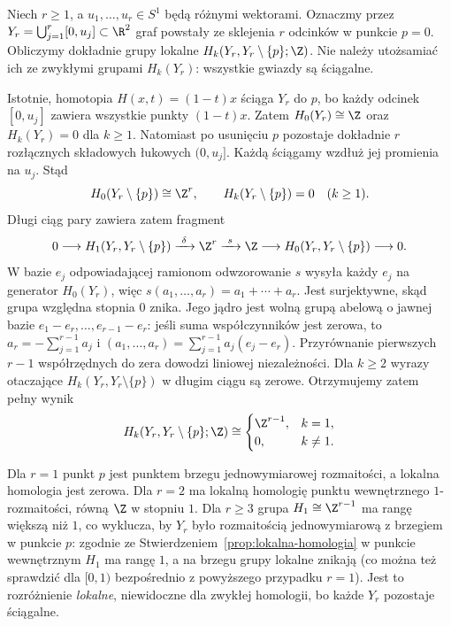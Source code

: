 \begin{przyklad}
\label{prz:homologia-lokalna-r-ramion-at05}
Niech $r\geq1$, a $u_1,\ldots,u_r\in S^1$
będą różnymi wektorami. Oznaczmy przez
$Y_r=\bigcup_{j=1}^r[0,u_j]\subset\R^2$
graf powstały ze sklejenia $r$ odcinków w punkcie
$p=0$. Obliczymy dokładnie grupy lokalne
$H_k(Y_r,Y_r\setminus\{p\};\Z)$.
Nie należy utożsamiać ich ze zwykłymi
grupami $H_k(Y_r)$: wszystkie gwiazdy są ściągalne.

Istotnie, homotopia $H(x,t)=(1-t)x$
ściąga $Y_r$ do $p$, bo każdy odcinek
$[0,u_j]$ zawiera wszystkie punkty $(1-t)x$.
Zatem $H_0(Y_r)\cong\Z$ oraz $H_k(Y_r)=0$
dla $k\geq1$. Natomiast po usunięciu $p$
pozostaje dokładnie $r$ rozłącznych
składowych łukowych $(0,u_j]$.
Każdą ściągamy wzdłuż jej promienia na $u_j$.
Stąd
\[
 H_0(Y_r\setminus\{p\})\cong\Z^r,\qquad
 H_k(Y_r\setminus\{p\})=0\quad(k\geq1).
\]
Długi ciąg pary zawiera zatem fragment
\[
 0\longrightarrow H_1(Y_r,Y_r\setminus\{p\})
 \xrightarrow{\ \delta\ }\Z^r
 \xrightarrow{\ s\ }\Z
 \longrightarrow H_0(Y_r,Y_r\setminus\{p\})
 \longrightarrow0.
\]
W bazie $e_j$ odpowiadającej ramionom
odwzorowanie $s$ wysyła każdy $e_j$ na
generator $H_0(Y_r)$, więc
$s(a_1,\ldots,a_r)=a_1+\cdots+a_r$.
Jest surjektywne, skąd grupa względna stopnia
$0$ znika. Jego jądro jest wolną grupą abelową
o jawnej bazie $e_1-e_r,\ldots,e_{r-1}-e_r$:
jeśli suma współczynników jest zerowa,
to $a_r=-\sum_{j=1}^{r-1}a_j$ i
$(a_1,\ldots,a_r)=\sum_{j=1}^{r-1}a_j(e_j-e_r)$.
Przyrównanie pierwszych $r-1$ współrzędnych do
zera dowodzi liniowej niezależności.
Dla $k\geq2$ wyrazy otaczające
$H_k(Y_r,Y_r\setminus\{p\})$
w długim ciągu są zerowe.
Otrzymujemy zatem pełny wynik
\[
 H_k(Y_r,Y_r\setminus\{p\};\Z)
 \cong
 \begin{cases}
 \Z^{r-1},& k=1,\\
 0,& k\ne1.
 \end{cases}
\]

Dla $r=1$ punkt $p$ jest punktem brzegu
jednowymiarowej rozmaitości, a lokalna homologia
jest zerowa. Dla $r=2$ ma lokalną homologię
punktu wewnętrznego $1$-rozmaitości, równą $\Z$
w stopniu $1$. Dla $r\geq3$
grupa $H_1\cong\Z^{r-1}$ ma rangę większą niż $1$,
co wyklucza, by $Y_r$ było rozmaitością
jednowymiarową z brzegiem w punkcie $p$:
zgodnie ze
Stwierdzeniem~\ref{prop:lokalna-homologia}
w punkcie wewnętrznym $H_1$ ma rangę $1$,
a na brzegu grupy lokalne znikają
(co można też sprawdzić dla $[0,1)$
bezpośrednio z powyższego przypadku $r=1$).
Jest to rozróżnienie \emph{lokalne}, niewidoczne
dla zwykłej homologii, bo każde $Y_r$
pozostaje ściągalne.
\end{przyklad}

